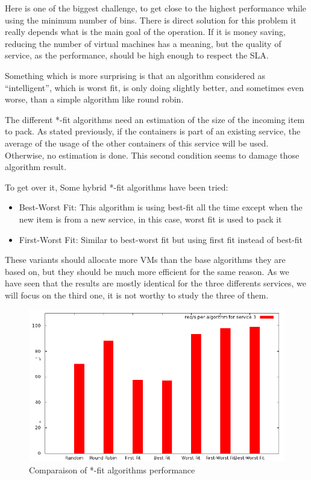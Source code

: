 Here is one of the biggest challenge, to get close to the highest performance
while using the minimum number of bins. There is direct solution for this problem
it really depends what is the main goal of the operation. If it is money saving,
reducing the number of virtual machines has a meaning, but the quality of service,
as the performance, should be high enough to respect the SLA\@.

Something which is more surprising is that an algorithm considered as
``intelligent'', which is worst fit, is only doing slightly better, and
sometimes even worse, than a simple algorithm like round robin.

The different *-fit algorithms need an estimation of the size of the incoming
item to pack. As stated previously, if the containers is part of an existing
service, the average of the usage of the other containers of this service will be
used. Otherwise, no estimation is done. This second condition seems to damage
those algorithm result.

To get over it, Some hybrid *-fit algorithms have been tried:

\begin{itemize}
	\item{Best-Worst Fit: This algorithm is using best-fit all the time except when
	the new item is from a new service, in this case, worst fit is used to pack
	it}
	\item{First-Worst Fit: Similar to best-worst fit but using first fit instead of 
	best-fit}
\end{itemize}

These variants should allocate more VMs than the base algorithms they are based on,
but they should be much more efficient for the same reason. As we have seen that the
results are mostly identical for the three differents services, we will focus on the
third one, it is not worthy to study the three of them.

\begin{figure}[h!]
	\includegraphics[width=\textwidth]{./Images/BinPacking/exp2ext-service3.png}
	\caption{Comparaison of *-fit algorithms performance}
\end{figure}

